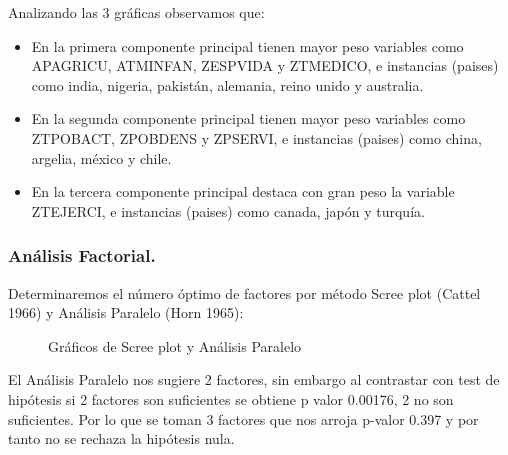 \documentclass[11pt,a4paper]{article}
\begin{document}
	Analizando las 3 gráficas observamos que:
	\begin{itemize}
		\item En la primera componente principal tienen mayor peso variables como APAGRICU, ATMINFAN, ZESPVIDA y ZTMEDICO, e instancias (paises) como india, nigeria, pakistán, alemania, reino unido y australia.
		\item En la segunda componente principal tienen mayor peso variables como ZTPOBACT, ZPOBDENS y ZPSERVI, e instancias (paises) como china, argelia, méxico y chile.
		\item En la tercera componente principal destaca con gran peso la variable ZTEJERCI, e instancias (paises) como canada, japón y turquía.
	\end{itemize}
    \subsubsection{Análisis Factorial.}
    Determinaremos el número óptimo de factores por método Scree plot (Cattel 1966) y Análisis Paralelo (Horn 1965):
    \begin{figure}[H]
		\centering
  \hfill
  \caption{Gráficos de Scree plot y Análisis Paralelo}
	\end{figure}
	
	El Análisis Paralelo nos sugiere 2 factores, sin embargo al contrastar con test de hipótesis si 2 factores son suficientes se obtiene p valor 0.00176, 2 no son suficientes. Por lo que se toman 3 factores que nos arroja p-valor 0.397 y por tanto no se rechaza la hipótesis nula.\\
	
\end{document}
